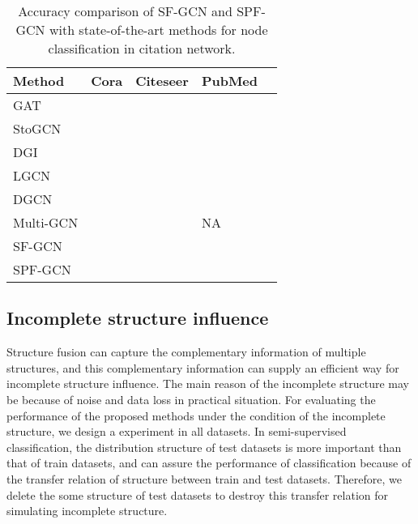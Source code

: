\documentclass[review]{elsarticle}
\begin{document}
\begin{table}[!ht]
\small
\renewcommand{\arraystretch}{1.0}
\caption{Accuracy comparison of SF-GCN and SPF-GCN with state-of-the-art methods for node classification in citation network.}
\label{table4}
\begin{center}
\newcommand{\tabincell}[2]{\begin{tabular}{@{}#1@{}}#2\end{tabular}}
\begin{tabular}{lp{2cm}p{2cm}p{2cm}p{2cm}}
\hline
\bfseries Method &\bfseries Cora &\bfseries Citeseer &\bfseries PubMed  \\
\hline \hline
GAT\cite{Veli2017Graph} &    & &     \\
\hline
StoGCN\cite{2017arXiv171010568C}  &    & &    \\
\hline
DGI\cite{Veli2018Deep}  &    & &    \\
\hline
LGCN\cite{2018arXiv180803965G}   &    & &    \\
\hline
DGCN\cite{zhuang2018dual}  &    & &    \\
\hline
Multi-GCN\cite{khan2019multi}  &    & & NA   \\
\hline\hline
SF-GCN &    & &    \\
\hline
SPF-GCN  &    &  &   \\
\hline
\end{tabular}
\end{center}
\end{table}

\subsection{Incomplete structure influence}
Structure fusion can capture the complementary information of multiple structures, and this complementary information can supply an efficient way for incomplete structure influence. The main reason of the incomplete structure may be because of noise and data loss in practical situation. For evaluating the performance of the proposed methods under the condition of the incomplete structure, we design a experiment in all datasets. In semi-supervised classification, the distribution structure of test datasets is more important than that of train datasets, and can assure the performance of classification because of the transfer relation of structure between train and test datasets. Therefore, we delete the some structure of test datasets to destroy this transfer relation for simulating incomplete structure.
\end{document}
